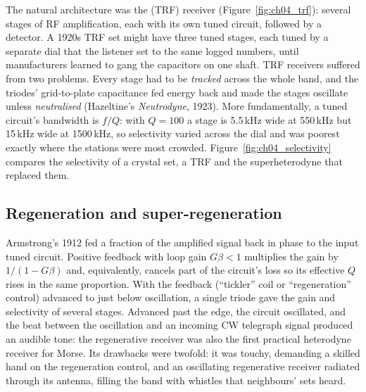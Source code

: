 The natural architecture was the  (TRF) receiver (Figure~\ref{fig:ch04_trf}): several stages of RF
amplification, each with its own tuned circuit, followed by a detector. A 1920s TRF set might have three
tuned stages, each tuned by a separate dial that the listener set to the same logged numbers, until
manufacturers learned to gang the capacitors on one shaft. TRF receivers suffered from two problems. Every
stage had to be \emph{tracked} across the whole band, and the triodes' grid-to-plate capacitance fed energy
back and made the stages oscillate unless \emph{neutralised} (Hazeltine's \emph{Neutrodyne}, 1923). More
fundamentally, a tuned circuit's bandwidth is $f/Q$: with $Q=100$ a stage is 5.5\,kHz wide at 550\,kHz but
15\,kHz wide at 1500\,kHz, so selectivity varied across the dial and was poorest exactly where the stations
were most crowded. Figure~\ref{fig:ch04_selectivity} compares the selectivity of a crystal set, a TRF and the
superheterodyne that replaced them.


\subsection{Regeneration and super-regeneration}

Armstrong's 1912  fed a fraction of the amplified signal back in phase to the
input tuned circuit. Positive feedback with loop gain $G\beta<1$ multiplies the gain by $1/(1-G\beta)$ and,
equivalently, cancels part of the circuit's loss so its effective $Q$ rises in the same proportion. With the
feedback (``tickler'' coil or ``regeneration'' control) advanced to just below oscillation, a single triode
gave the gain and selectivity of several stages. Advanced past the edge, the circuit oscillated, and the beat
between the oscillation and an incoming CW telegraph signal produced an audible tone: the regenerative
receiver was also the first practical heterodyne receiver for Morse. Its drawbacks were twofold: it was
touchy, demanding a skilled hand on the regeneration control, and an oscillating regenerative receiver
radiated through its antenna, filling the band with whistles that neighbours' sets heard.

